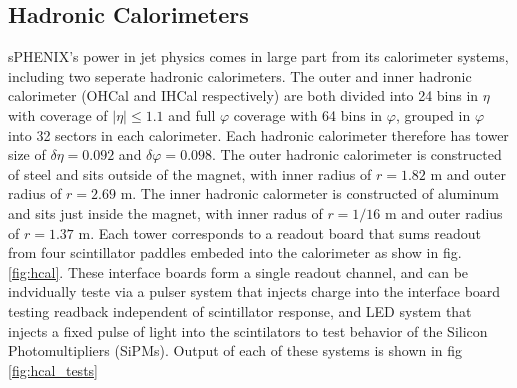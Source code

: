 \documentclass[letterpaper, 12pt, oneside]{book}
\theoremstyle{definition}
\begin{document}
	\subsection{Hadronic Calorimeters}
		sPHENIX's power in jet physics comes in large part from its calorimeter systems, including two seperate hadronic calorimeters. 
		The outer and inner hadronic calorimeter (OHCal and IHCal respectively) are both divided into 24 bins in $\eta$ with coverage of $|\eta| \leq 1.1$  and full $\varphi$ coverage with 64 bins in $\varphi$, grouped in $\varphi$ into 32 sectors in each calorimeter. 
		Each hadronic calorimeter therefore has tower size of $\delta \eta = 0.092$ and $\delta \varphi=0.098$.  
		The outer hadronic calorimeter is constructed of steel and sits outside of the magnet, with inner radius of $r=1.82$ m and outer radius of $r=2.69$ m. 
		The inner hadronic calormeter is constructed of aluminum and sits just inside the magnet, with inner radus of $r=1/16$ m and outer radius of $r=1.37$ m. 
		Each tower corresponds to a readout board that sums readout from four scintillator paddles embeded into the calorimeter as show in fig. \ref{fig:hcal}. 
		These interface boards form a single readout channel, and can be indvidually teste via a pulser system that injects charge into the interface board testing readback independent of scintillator response, and LED system that injects a fixed pulse of light into the scintilators to test behavior of the Silicon Photomultipliers (SiPMs). 
		Output of each of these systems is shown in fig \ref{fig:hcal_tests}
\end{document}
